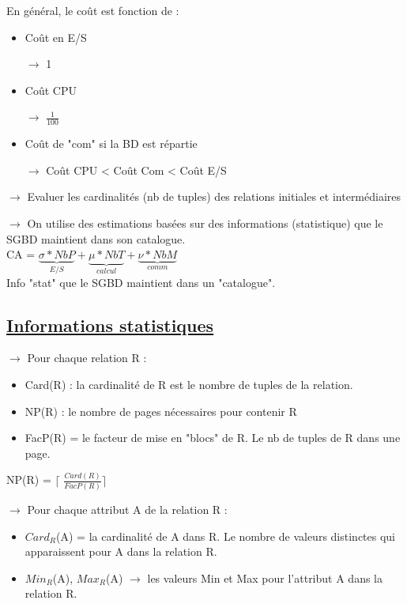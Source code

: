 \documentclass{article}
\begin{document}
En général, le coût est fonction de :
\begin{itemize}
	\item Coût en E/S 

$\rightarrow$ 1
	\item Coût CPU

 $\rightarrow$ $\frac{1}{100}$
	\item Coût de "com" si la BD est répartie 

$\rightarrow$ Coût CPU < Coût Com < Coût E/S
\end{itemize}

$\rightarrow$ Evaluer les cardinalités (nb de tuples) des relations initiales et intermédiaires

$\rightarrow$ On utilise des estimations basées sur des informations (statistique) que le SGBD maintient dans son catalogue.\\

CA = $\underbrace{\sigma*NbP}_{E/S}+\underbrace{\mu*NbT}_{calcul}+\underbrace{\nu*NbM}_{comm}$\\

Info "stat" que le SGBD maintient dans un "catalogue".\\

\subsection*{\underline{Informations statistiques}}

$\rightarrow$ Pour chaque relation R :
\begin{itemize}\renewcommand{\labelitemi}{$\bullet$}
	\item Card(R) : la cardinalité de R est le nombre de tuples de la relation.
	\item NP(R) : le nombre de pages nécessaires pour contenir R
	\item FacP(R) = le facteur de mise en "blocs" de R. Le nb de tuples de R dans une page.
\end{itemize}

NP(R) = $\lceil$ $\frac{Card(R)}{FacP(R)}$$\rceil$

$\rightarrow$ Pour chaque attribut A de la relation R :

\begin{itemize}\renewcommand{\labelitemi}{$\bullet$}
	\item $Card_{R}$(A) = la cardinalité de A dans R. Le nombre de valeurs distinctes qui apparaissent pour A dans la relation R.
	\item $Min_{R}$(A), $Max_{R}$(A) $\rightarrow$ les valeurs Min et Max pour l'attribut A dans la relation R.
\end{itemize}
\end{document}
